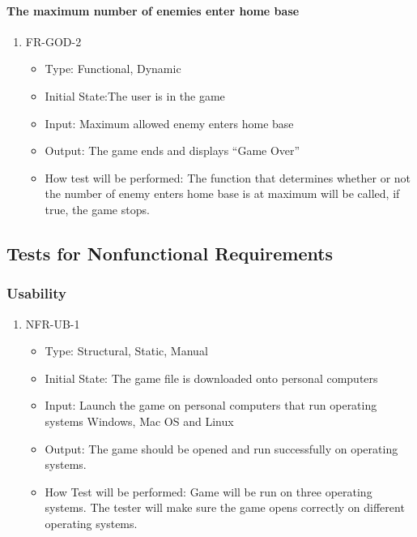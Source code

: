 \documentclass[12,english]{article}
\begin{document}
\paragraph{The maximum number of enemies enter home base}
\begin{enumerate}
  \item FR-GOD-2
  \begin{itemize}
      \item Type: Functional, Dynamic
      \item Initial State:The user is in the game
      \item Input: Maximum allowed enemy enters home base
      \item Output: The game ends and displays “Game Over”
      \item How test will be performed: The function that determines whether or not the number of enemy enters home base is at maximum will be called, if true, the game stops.
  \end{itemize}
\end{enumerate}

\subsection{Tests for Nonfunctional Requirements}
\subsubsection{Usability}
\begin{enumerate}
    \item NFR-UB-1
    \begin{itemize}
        \item Type: Structural, Static, Manual
        \item Initial State: The game file is downloaded onto personal computers
        \item Input: Launch the game on personal computers that run operating systems Windows, Mac OS and Linux
        \item Output: The game should be opened and run successfully on operating systems.
        \item How Test will be performed: Game will be run on three operating systems. The tester will make sure the game opens correctly on different operating systems.
    \end{itemize}
\end{enumerate}
\end{document}

